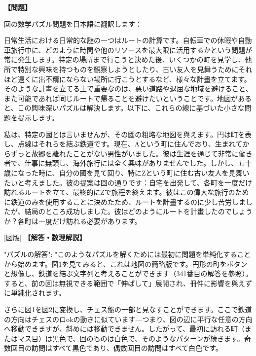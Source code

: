 \documentclass[10pt,a4paper,oneside,openany]{ltjsbook}
\begin{document}
\begin{tcolorbox}[colback=softblue,colframe=primaryblue,title=\textbf{第 250 問：THE GRAND TOUR.},arc=2mm,boxrule=1pt,breakable]
\textbf{【問題】}\par\vspace{0.3em}
回の数学パズル問題を日本語に翻訳します：

日常生活における日常的な謎の一つはルートの計算です。自転車での休暇や自動車旅行中に、どのように時間や他のリソースを最大限に活用するかという問題が常に発生します。特定の場所まで行こうと決めた後、いくつかの町を見学し、他所で特別な興味を持つものを観察しようとしたり、古い友人を見舞うためにそれほど遠くに出不精にならない場所に行こうとするなど、様々な計畫を立てます。そのような計畫を立てる上で重要なのは、悪い道路や退屈な地域を避けること、また可能であれば同じルートで帰ることを避けたいということです。地図があると、この興味深いパズルは解決します。以下に、これらの線に基づいた小さな問題を提示します。

私は、特定の國とは言いませんが、その國の粗略な地図を與えます。円は町を表し、点線はそれらを結ぶ鉄道です。現在、Aという町に住んでおり、生まれてからずっと故郷を離れたことがない男性がいました。彼は生涯を通じて非常に働き者で、仕事に無頭し、海外旅行には全く興味がありませんでした。しかし、五十歳になった時に、自分の國を見て回り、特にZという町に住む古い友人を見舞いたいと考えました。彼の提案は回の通りです：自宅を出発して、各町を一度だけ訪れるルートを立て、最終的にZで旅程を終えます。彼はこの偉大な旅行のために鉄道のみを使用することに決めたため、ルートを計畫するのに少し苦労しましたが、結局のところ成功しました。彼はどのようにルートを計畫したのでしょうか？各町は一度だけ訪れる必要があります。

[図版]
\tcblower
\textbf{【解答・数理解説】}\par\vspace{0.3em}
{
"パズルの解答": "このようなパズルを解くためには最初に問題を単純化することから始めます。図1を見てみると、これは地図の簡略版です。円形の町をボタンと想像し、鉄道を結ぶ文字列と考えることができます（341番目の解答を參照）。すると、前の図は無視できる範囲で「伸ばして」展開され、冊件に影響を與えずに単純化されます。

さらに図1を図2に変換し、チェス盤の一部と見なすことができます。ここで鉄道の方向はチェスのロokの動きに似ています—つまり、図の辺に平行な任意の方向へ移動できますが、斜めには移動できません。したがって、最初に訪れる町（またはマス目）は黒色で、回のものは白色で、そのようなパターンが続きます。奇数回目の訪問はすべて黒色であり、偶数回目の訪問はすべて白色です。

}
\end{tcolorbox}
\end{document}
